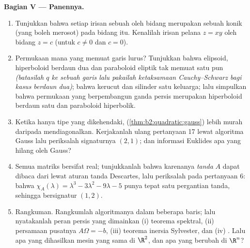 \begin{problem}
\medskip
\noindent\textbf{Bagian V --- Panennya.}
\begin{enumerate}[resume]
  \item Tunjukkan bahwa setiap irisan sebuah  oleh bidang
         merupakan sebuah konik (yang boleh merosot) pada bidang itu.
        Kenalilah irisan pelana $z = xy$ oleh
        bidang $z = c$ (untuk $c \neq 0$ dan $c = 0$).
  \item Permukaan  mana yang memuat garis lurus? Tunjukkan
        bahwa elipsoid, hiperboloid berdaun dua dan
        paraboloid eliptik tak memuat satu pun \emph{(batasilah $q$
        ke sebuah garis lalu pakailah ketaksamaan Cauchy--Schwarz bagi
        kasus berdaun dua)}; bahwa kerucut dan silinder
         satu keluarga; lalu simpulkan bahwa permukaan 
        yang berpembangun ganda persis merupakan hiperboloid berdaun satu
        dan paraboloid hiperbolik.
  \item Ketika hanya tipe \emph{} yang dikehendaki,  (\cref{thm:b2:quadratic:gauss}) lebih murah
        daripada mendiagonalkan. Kerjakanlah ulang pertanyaan 17 lewat algoritma
        Gauss lalu periksalah signaturnya $(2, 1)$; dan informasi
        Euklides apa yang hilang oleh Gauss?
  \item Semua  matriks  bersifat real; tunjukkanlah
        bahwa karenanya \emph{tanda} 
        $A$ dapat dibaca dari 
        lewat aturan tanda Descartes, lalu periksalah pada
        pertanyaan 6: bahwa $\chi_A(\lambda) = \lambda^3 - 3\lambda^2
        - 9\lambda - 5$ punya tepat satu pergantian tanda, sehingga
        bersignatur $(1, 2)$.
  \item Rangkuman. Rangkumlah algoritmanya dalam beberapa baris;
        lalu nyatakanlah peran persis yang dimainkan (i) teorema
        spektral, (ii) persamaan pusatnya $A\Omega = -b$,
        (iii) teorema inersia Sylvester, dan (iv) . Lalu apa yang dihasilkan mesin yang sama di
        $\R^2$, dan apa yang berubah di $\R^n$?

\end{enumerate}
\end{problem}
